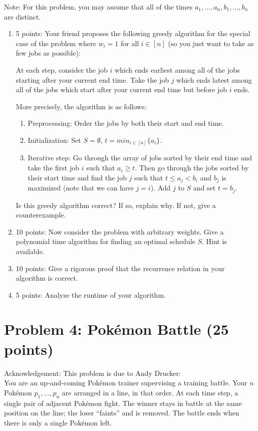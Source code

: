 \documentclass[12pt]{article}
\begin{document}
Note: For this problem, you may assume that all of the times $a_1,\ldots,a_n,b_1,\ldots,b_n$ are distinct.
\begin{enumerate}
\item[(a)] 5 points: Your friend proposes the following greedy algorithm for the special case of the problem where $w_i = 1$ for all $i \in [n]$ (so you just want to take as few jobs as possible):

At each step, consider the job $i$ which ends earliest among all of the jobs starting after your current end time. Take the job $j$ which ends latest among all of the jobs which start after your current end time but before job $i$ ends.

More precisely, the algorithm is as follows:
\begin{enumerate}
\item[] Preprocessing: Order the jobs by both their start and end time.
\item[] Initialization: Set $S = \emptyset$, $t = min_{i \in [n]}{\{a_i\}}$.
\item[] Iterative step: Go through the array of jobs sorted by their end time and take the first job $i$ such that $a_i \geq t$. Then go through the jobs sorted by their start time and find the job $j$ such that $t \leq a_j < b_i$ and $b_j$ is maximized (note that we can have $j = i$). Add $j$ to $S$ and set $t = b_j$.
\end{enumerate}
Is this greedy algorithm correct? If so, explain why. If not, give a counterexample.
\item[(b)] 10 points: Now consider the problem with arbitrary weights. Give a polynomial time algorithm for finding an optimal schedule $S$. Hint is available.
\item[(c)] 10 points: Give a rigorous proof that the recurrence relation in your algorithm is correct.
\item[(d)] 5 points: Analyze the runtime of your algorithm.
\end{enumerate}
\section*{Problem 4: Pok\'{e}mon Battle (25 points)}
Acknowledgement: This problem is due to Andy Drucker:\\
You are an up-and-coming Pok\'{e}mon trainer supervising a training battle. Your $n$ Pok\'{e}mon $p_1, \ldots , p_n$ are arranged in a line, in that order. At each time step, a single pair of adjacent Pok\'{e}mon fight. The winner stays in battle at the same position on the line; the loser ``faints'' and is removed. The battle ends when there is only a single Pok\'{e}mon left.
\end{document}
